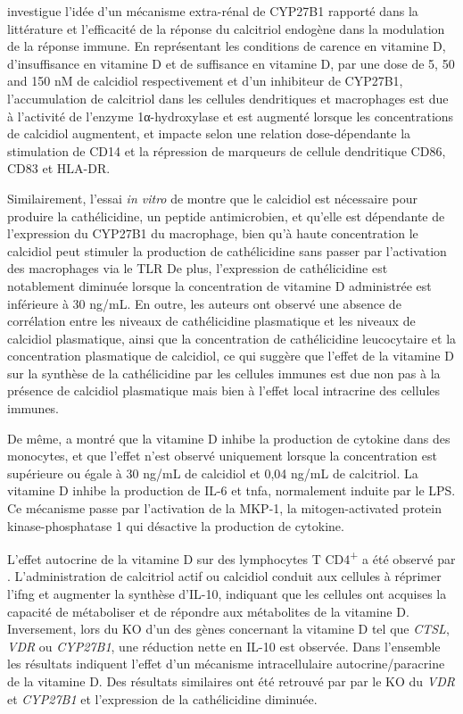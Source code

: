 \documentclass[
  a4paper,
  DIV=11,
  numbers=noendperiod,
  listof=totoc]{scrreprt}
\begin{document}
\textcite{Hewison.2007} investigue l'idée d'un mécanisme extra-rénal de
\ac{CYP27B1} rapporté dans la littérature et l'efficacité de la réponse
du calcitriol endogène dans la modulation de la réponse immune. En
représentant les conditions de carence en vitamine D, d'insuffisance en
vitamine D et de suffisance en vitamine D, par une dose de 5, 50 and 150
nM de calcidiol respectivement et d'un inhibiteur de CYP27B1,
l'accumulation de calcitriol dans les cellules dendritiques et
macrophages est due à l'activité de l'enzyme 1α-hydroxylase et est
augmenté lorsque les concentrations de calcidiol augmentent, et impacte
selon une relation dose-dépendante la stimulation de CD14 et la
répression de marqueurs de cellule dendritique CD86, CD83 et HLA-DR.

Similairement, l'essai \emph{in vitro} de \textcite{Adams.2009} montre
que le calcidiol est nécessaire pour produire la cathélicidine, un
peptide antimicrobien, et qu'elle est dépendante de l'expression du
\ac{CYP27B1} du macrophage, bien qu'à haute concentration le calcidiol
peut stimuler la production de cathélicidine sans passer par
l'activation des macrophages via le \ac{TLR} De plus, l'expression de
cathélicidine est notablement diminuée lorsque la concentration de
vitamine D administrée est inférieure à 30 ng/mL. En outre, les auteurs
ont observé une absence de corrélation entre les niveaux de
cathélicidine plasmatique et les niveaux de calcidiol plasmatique, ainsi
que la concentration de cathélicidine leucocytaire et la concentration
plasmatique de calcidiol, ce qui suggère que l'effet de la vitamine D
sur la synthèse de la cathélicidine par les cellules immunes est due non
pas à la présence de calcidiol plasmatique mais bien à l'effet local
intracrine des cellules immunes.

De même, \textcite{Zhang.2012} a montré que la vitamine D inhibe la
production de cytokine dans des monocytes, et que l'effet n'est observé
uniquement lorsque la concentration est supérieure ou égale à 30 ng/mL
de calcidiol et 0,04 ng/mL de calcitriol. La vitamine D inhibe la
production de IL-6 et \ac{tnfa}, normalement induite par le \ac{LPS}. Ce
mécanisme passe par l'activation de la MKP-1, la mitogen-activated
protein kinase-phosphatase 1 qui désactive la production de cytokine.

L'effet autocrine de la vitamine D sur des lymphocytes T
CD4\textsuperscript{+} a été observé par \textcite{Chauss.2022}.
L'administration de calcitriol actif ou calcidiol conduit aux cellules à
réprimer l'\ac{ifng} et augmenter la synthèse d'\ac{IL-10}, indiquant
que les cellules ont acquises la capacité de métaboliser et de répondre
aux métabolites de la vitamine D. Inversement, lors du KO d'un des gènes
concernant la vitamine D tel que \emph{CTSL}, \emph{VDR} ou
\emph{CYP27B1}, une réduction nette en \ac{IL-10} est observée. Dans
l'ensemble les résultats indiquent l'effet d'un mécanisme
intracellulaire autocrine/paracrine de la vitamine D. Des résultats
similaires ont été retrouvé par \textcite{Adams.2009} par le KO du
\emph{VDR} et \emph{CYP27B1} et l'expression de la cathélicidine
diminuée.
\end{document}
